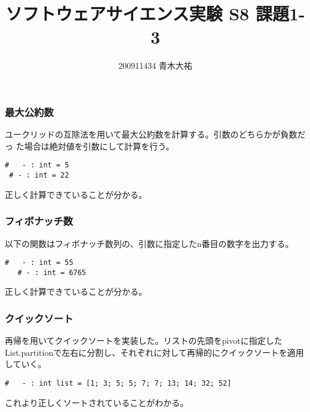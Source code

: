 \documentclass[a4paper,9pt]{jarticle}
\title{ソフトウェアサイエンス実験 S8 課題1-3}
\author{200911434 青木大祐}
\begin{document}
\maketitle
\newpage
\setcounter{section}{1}
\setcounter{subsection}{3}
\subsubsection{最大公約数}
ユークリッドの互除法を用いて最大公約数を計算する。引数のどちらかが負数だっ
た場合は絶対値を引数にして計算を行う。



\begin{lstlisting}[caption=実行結果]
 #   - : int = 5
 # - : int = 22
\end{lstlisting}
正しく計算できていることが分かる。

\subsubsection{フィボナッチ数}
以下の関数はフィボナッチ数列の、引数に指定したn番目の数字を出力する。



\begin{lstlisting}[caption=実行結果]
   #   - : int = 55
   # - : int = 6765
\end{lstlisting}
正しく計算できていることが分かる。
 
\subsubsection{クイックソート}
再帰を用いてクイックソートを実装した。リストの先頭をpivotに指定したList.partitionで左右に分割し、それぞれに対して再帰的にクイックソートを適用していく。


\begin{lstlisting}[caption=実行結果]
   #   - : int list = [1; 3; 5; 5; 7; 7; 13; 14; 32; 52]
\end{lstlisting}
これより正しくソートされていることがわかる。
\end{document}
